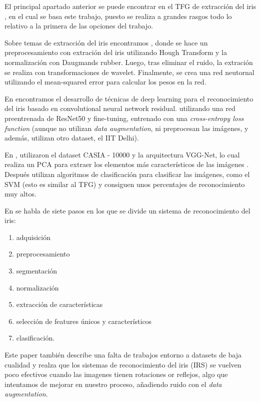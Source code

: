  \label{capitulo6}

El principal apartado anterior se puede  encontrar en el TFG de extracción del iris \cite{tfg_iris_2020}, en el cual se basa este trabajo, puesto se realiza a grandes rasgos
todo lo relativo a la primera de las opciones del trabajo.

Sobre temas de extracción del iris encontramos \cite{abdullah_iris_2015}, donde se hace un preprocesamiento con extración del iris utilizando Hough Transform y la 
normalización con Daugmands rubber. Luego, tras eliminar el ruido, la extración se realiza con transformaciones de wavelet. Finalmente, se crea una red neutornal
utilizando el mean-squared error para calcular los pesos en la red.

En \cite{minaee_deepiris_2019} encontramos el desarrollo de técnicas de deep learning para el reconocimiento del iris basado en convolutional neural network residual. utilizando una red preentrenada 
de ResNet50 y fine-tuning, entrenado con una \textit{cross-entropy loss function} (aunque no utilizan \textit{data augmentation}, ni preprocesan las imágenes, y además, utilizan otro dataset, el IIT Delhi). 

En \cite{minaee_experimental_2017}, utilizaron el dataset CASIA - 10000 y la arquitectura VGG-Net, lo cual realiza un PCA para extraer los elementos
más característicos de las imágenes . Después utilizan algoritmos de clasificación para clasificar las imágenes, como el SVM (esto es similar al TFG) y consiguen unos percentajes
de reconocimiento muy altos.

En \cite{malgheet_iris_2021} se habla de siete pasos en los que se divide un sistema de reconocimiento del iris:
\begin{enumerate}
\item adquisición
\item preprocesamiento
\item segmentación
\item normalización
\item extracción de características
\item selección de features únicos y característicos
\item clasificación. 
\end{enumerate}
 
 Este paper también describe una falta de
 trabajos entorno a datasets de baja cualidad y realza que los sistemas de reconocimiento del iris (IRS) se vuelven 
 poco efectivos cuando las imagenes tienen rotaciones or reflejos, algo que intentamos de mejorar en nuestro proceso, añadiendo ruido con el \textit{data augmentation}.

